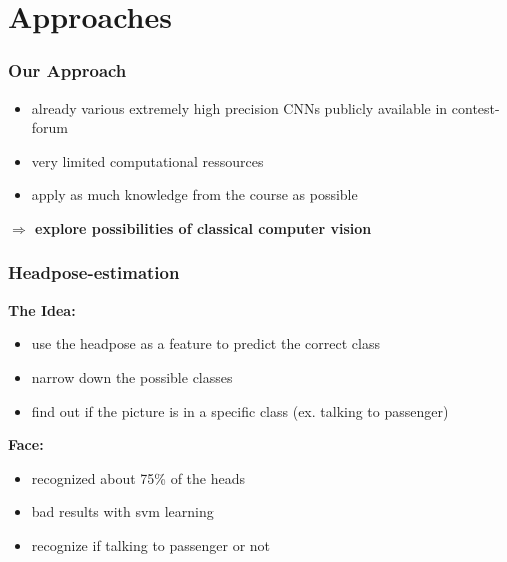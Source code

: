 \documentclass{beamer}
\begin{document}
	\section{Approaches}

    \begin{frame}
        \frametitle{Our Approach}
        \begin{itemize}
            \item already various extremely high precision CNNs publicly available in contest-forum
            \item very limited computational ressources
            \item apply as much knowledge from the course as possible
        \end{itemize}
        \vspace{1cm}
        \begin{centering}
           \Large \textbf{$\Rightarrow$ explore possibilities of classical computer vision}
        \end{centering}
        
    \end{frame}

	\begin{frame}
		\frametitle{Headpose-estimation}
        \textbf{The Idea:}
		\begin{itemize}
			\item use the headpose as a feature to predict the correct class
			\item narrow down the possible classes
			\item find out if the picture is in a specific class (ex. talking to passenger)
		\end{itemize}
        \textbf{Face:}
		\begin{itemize}
			\item recognized about 75\% of the heads
			\item bad results with svm learning
			\item recognize if talking to passenger or not
		\end{itemize}
	\end{frame}
	
\end{document}
